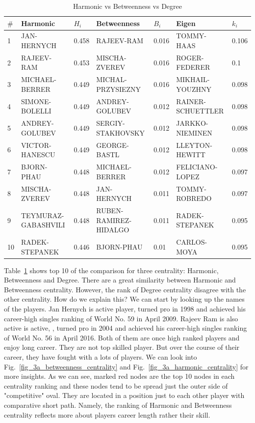 \documentclass[runningheads]{llncs}
\begin{document}
\begin{table}
\caption{Harmonic vs Betweenness vs Degree}\label{tab_total_compare}
\begin{tabular}{|l|l|l|l|l|l|l|} \hline
\(\#\) & Harmonic & \(H_{i}\)  & Betweenness & \(B_{i}\) & Eigen & \(k_{i}\) \\ \hline
1 & JAN-HERNYCH & 0.458 & RAJEEV-RAM & 0.016 & TOMMY-HAAS & 0.106 \\ \hline
2 & RAJEEV-RAM & 0.453 & MISCHA-ZVEREV & 0.016 & ROGER-FEDERER & 0.1 \\ \hline
3 & MICHAEL-BERRER & 0.449 & MICHAL-PRZYSIEZNY & 0.016 & MIKHAIL-YOUZHNY & 0.098 \\ \hline
4 & SIMONE-BOLELLI & 0.449 & ANDREY-GOLUBEV & 0.012 & RAINER-SCHUETTLER & 0.098 \\ \hline
5 & ANDREY-GOLUBEV & 0.449 & SERGIY-STAKHOVSKY & 0.012 & JARKKO-NIEMINEN & 0.098 \\ \hline
6 & VICTOR-HANESCU & 0.449 & GEORGE-BASTL & 0.012 & LLEYTON-HEWITT & 0.098 \\ \hline
7 & BJORN-PHAU & 0.448 & MICHAEL-BERRER & 0.012 & FELICIANO-LOPEZ & 0.097 \\ \hline
8 & MISCHA-ZVEREV & 0.448 & JAN-HERNYCH & 0.011 & TOMMY-ROBREDO & 0.097 \\ \hline
9 & TEYMURAZ-GABASHVILI & 0.448 & RUBEN-RAMIREZ-HIDALGO & 0.011 & RADEK-STEPANEK & 0.095 \\ \hline
10 & RADEK-STEPANEK & 0.446 & BJORN-PHAU & 0.01 & CARLOS-MOYA & 0.095 \\ \hline

\end{tabular}
\end{table}

Table~\ref{tab_total_compare} shows top 10 of the comparison for three centrality: Harmonic, Betweenness and Degree. There are a great similarity between Harmonic and Betweenness centrality. However, the rank of Degree centrality disagree with the other centrality. How do we explain this? We can start by looking up the names of the players. Jan Hernych is active player, turned pro in 1998 and achieved his career-high singles ranking of World No. 59 in April 2009. Rajeev Ram is also active is active, , turned pro in 2004 and achieved his career-high singles ranking of World No. 56 in April 2016. Both of them are once high ranked players and enjoy long career. They are not top skilled player. But over the course of their career, they have fought with a lots of players. We can look into Fig.~\ref{fig_3a_betweenness_centrality} and Fig.~\ref{fig_3a_harmonic_centrality} for more insights. As we can see, marked red nodes are the top 10 nodes in each centrality ranking and these nodes tend to be spread just the outer side of "competitive" oval. They are located in a position just to each other player with comparative short path. Namely, the ranking of Harmonic and Betweenness centrality reflects more about players career length rather their skill.
\end{document}
